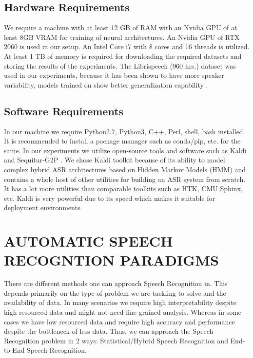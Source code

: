 \documentclass[letterpaper,12pt]{article}
\begin{document}
\subsection{Hardware Requirements}
We require a machine with at least 12 GB of RAM with an Nvidia GPU of at least 8GB 
VRAM for training of neural architectures. An Nvidia GPU of RTX 2060 is used in our setup. 
An Intel Core i7 with 8 cores and 16 threads is utilized. At least 1 TB of memory is required 
for downloading the required datasets and storing the results of the experiments. The 
Librispeech (960 hrs.) dataset was used in our experiments, because it has been shown to have 
more speaker variability, models trained on show better generalization capability .

\subsection{Software Requirements}

In our machine we require Python2.7, Python3, C++, Perl, shell, bash installed. It is 
recommended to install a package manager such as conda/pip, etc. for the same. In our 
experiments we utilize open-source tools and software such as Kaldi and Sequitur-G2P \cite{bisani2008joint}. 
We chose Kaldi toolkit \cite{povey2011kaldi} because of its ability to model complex hybrid ASR architectures 
based on Hidden Markov Models (HMM) and contains a whole host of other utilities for 
building an ASR system from scratch. It has a lot more utilities than comparable toolkits such 
as HTK, CMU Sphinx, etc. Kaldi is very powerful due to its speed which makes it suitable for 
deployment environments.

\pagebreak


\section{AUTOMATIC SPEECH RECOGNTION PARADIGMS}

There are different methods one can approach Speech Recognition in. This depends primarily 
on the type of problem we are tackling to solve and the availability of data. In many scenarios 
we require high interpretability despite high resourced data and might not need fine-grained 
analysis. Whereas in some cases we have low resourced data and require high accuracy and 
performance despite the bottleneck of less data. Thus, we can approach the Speech 
Recognition problem in 2 ways: Statistical/Hybrid Speech Recognition and End-to-End 
Speech Recognition.
\end{document}
